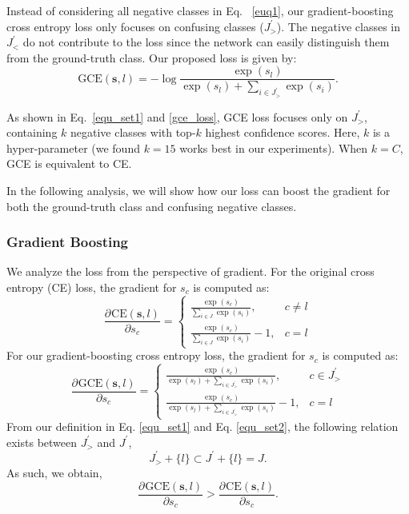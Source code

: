 \documentclass[letterpaper]{article} \usepackage{aaai20}  \usepackage{times}  \usepackage{helvet} \usepackage{courier}  \usepackage[hyphens]{url}  \usepackage{graphicx} \usepackage{multirow}
\newcommand*{\pd}[3][]{\ensuremath{\frac{\partial^{#1} #2}{\partial #3}}}
\begin{document}
Instead of considering all negative classes in Eq.~ \ref{euq1}, our gradient-boosting cross entropy loss only focuses on confusing classes ($J^{'}_{>}$). The negative classes in $J^{'}_{<}$ do not contribute to the loss since the network can easily distinguish them from the ground-truth class. Our proposed loss is given by:
\begin{equation}\label{gce_loss}
    \text{GCE}(\mathbf{s},l)=-\log \frac{\exp{(s_{l})}}{\exp{(s_{l})}+\sum_{i\in J^{'}_{>}}\exp{(s_i)}}.
\end{equation}

As shown in Eq.~\ref{equ_set1} and \ref{gce_loss}, GCE loss focuses only on $J^{'}_{>}$, containing $k$ negative classes with top-$k$ highest confidence scores. Here, $k$ is a hyper-parameter (we found $k=15$ works best in our experiments). When $k=C$, GCE is equivalent to CE. 

In the following analysis, we will show how our loss can boost the gradient for both the ground-truth class and confusing negative classes.




\subsubsection{Gradient Boosting}
We analyze the loss from the perspective of gradient. For the original cross entropy (CE) loss, the gradient for $s_c$ is computed as:
\begin{equation}
    \pd{\text{CE}(\textbf{s},l)}{s_c}=\begin{cases}
    \frac{\exp{(s_c)}}{\sum_{i\in J}\exp{(s_i)}}, & c\neq l\\
    \frac{\exp{(s_c)}}{\sum_{i\in J}\exp{(s_i)}}-1, & c= l 
    \end{cases}
\end{equation}
For our gradient-boosting cross entropy loss, the gradient for $s_c$ is computed as:
\begin{equation}
    \pd{\text{GCE}(\textbf{s},l)}{s_c}=\begin{cases}
    \frac{\exp{(s_c)}}{\exp{(s_{l})}+\sum_{i\in J^{'}_{>}}\exp{(s_i)}}, & c\in J^{'}_{>}\\
    \frac{\exp{(s_c)}}{\exp{(s_{l})}+\sum_{i\in J^{'}_{>}}\exp{(s_i)}}-1, &c= l
    \end{cases}
\end{equation}
From our definition in Eq. \ref{equ_set1} and Eq. \ref{equ_set2}, the following relation exists between $J^{'}_{>}$ and $J^{'}$,
\begin{equation}
    J^{'}_{>} + \{l\} \subset J^{'}+\{l\}= J.
\end{equation}
As such, we obtain,
\begin{equation}
    \pd{\text{GCE}(\mathbf{s},l)}{s_c}> \pd{\text{CE}(\mathbf{s},l)}{s_c}.
\end{equation}
\end{document}
